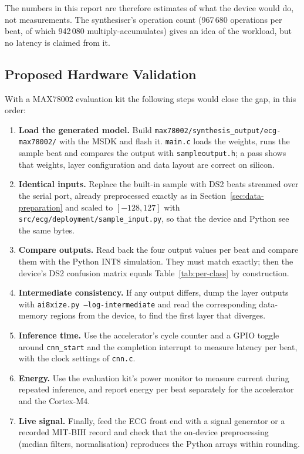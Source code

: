 The numbers in this report are therefore estimates of what the device would do, not measurements. The synthesiser's operation count (967\,680 operations per beat, of which 942\,080 multiply-accumulates) gives an idea of the workload, but no latency is claimed from it.

\subsection{Proposed Hardware Validation}
\label{sec:hardware-validation}

With a MAX78002 evaluation kit the following steps would close the gap, in this order:

\begin{enumerate}[nosep]
  \item \textbf{Load the generated model.} Build \texttt{max78002/synthesis\_output/ecg-max78002/} with the MSDK and flash it. \texttt{main.c} loads the weights, runs the sample beat and compares the output with \texttt{sampleoutput.h}; a pass shows that weights, layer configuration and data layout are correct on silicon.
  \item \textbf{Identical inputs.} Replace the built-in sample with DS2 beats streamed over the serial port, already preprocessed exactly as in Section~\ref{sec:data-preparation} and scaled to $[-128, 127]$ with \texttt{src/ecg/deployment/sample\_input.py}, so that the device and Python see the same bytes.
  \item \textbf{Compare outputs.} Read back the four output values per beat and compare them with the Python INT8 simulation. They must match exactly; then the device's DS2 confusion matrix equals Table~\ref{tab:per-class} by construction.
  \item \textbf{Intermediate consistency.} If any output differs, dump the layer outputs with \texttt{ai8xize.py --log-intermediate} and read the corresponding data-memory regions from the device, to find the first layer that diverges.
  \item \textbf{Inference time.} Use the accelerator's cycle counter and a GPIO toggle around \texttt{cnn\_start} and the completion interrupt to measure latency per beat, with the clock settings of \texttt{cnn.c}.
  \item \textbf{Energy.} Use the evaluation kit's power monitor to measure current during repeated inference, and report energy per beat separately for the accelerator and the Cortex-M4.
  \item \textbf{Live signal.} Finally, feed the ECG front end with a signal generator or a recorded MIT-BIH record and check that the on-device preprocessing (median filters, normalisation) reproduces the Python arrays within rounding.
\end{enumerate}
